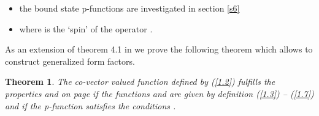 \documentclass[a4paper,a4paper]{article}
\newtheorem{theorem}{Theorem}
\begin{document}
\begin{itemize}
\item[\myHighlight{$(iv^{\prime })$}\coordHE{}]  the bound state p-functions are investigated in
section \ref{s6}

\item[\myHighlight{$(v^{\prime })$}\coordHE{}]  \coordHE{} where \coordHE{} is the `spin' of the operator \coordHE{}.
\end{itemize}

As an extension of theorem 4.1 in \cite{BFKZ} we prove the following theorem
which allows to construct generalized form factors.

\begin{theorem}
\label{t} The co-vector valued function \coordHE{} defined by (\ref{1.2}) fulfills the properties \coordHE{} and \coordHE{} on page \pageref{pf} if the functions \coordHE{} and \coordHE{} are given by definition (\ref{1.3}) -- (\ref{1.7}) and if the
p-function \coordHE{}
satisfies the conditions \coordHE{}.
\end{theorem}
\end{document}
